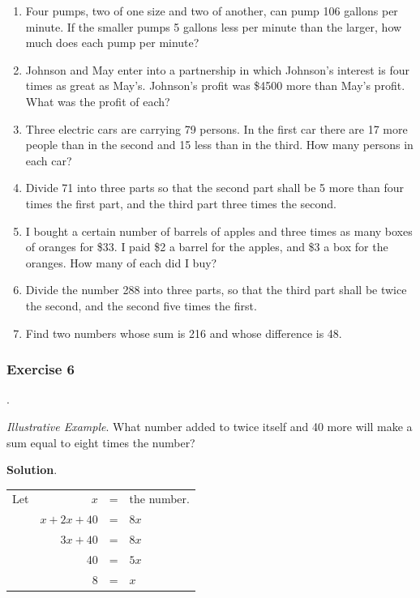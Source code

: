 \documentclass{book}
\begin{document}
\begin{enumerate}
\item Four pumps, two of one size and two of another, can pump 106
gallons per minute. If the smaller pumps 5 gallons less per minute
than the larger, how much does each pump per minute?

\item Johnson and May enter into a partnership in which Johnson's
interest is four times as great as May's. Johnson's profit was
\$4500 more than May's profit. What was the profit of each?

\item Three electric cars are carrying 79 persons. In the first
car there are 17 more people than in the second and 15 less than
in the third. How many persons in each car?

\item Divide 71 into three parts so that the second part shall be
5 more than four times the first part, and the third part three
times the second.

\item I bought a certain number of barrels of apples and three
times as many boxes of oranges for \$33. I paid \$2 a barrel for
the apples, and \$3 a box for the oranges. How many of each did I
buy?

\item Divide the number 288 into three parts, so that the third
part shall be twice the second, and the second five times the
first.

\item Find two numbers whose sum is 216 and whose difference is
48.
\end{enumerate}

\subsubsection*{Exercise 6}.

\textit{ Illustrative Example}. What number added to twice itself
and 40 more will make a sum equal to eight times the number?

\begin{center}
\textbf{ Solution}.
\end{center}

\begin{center}
\begin{tabular}{l r c l}
Let & $x$ &=& the number. \\
& $x + 2x + 40$ &=& $8x$\\
& $3x + 40$ &=& $8x$\\
& 40 &=& $5x$\\
& $8 $&=& $x$\\
\end{tabular}
\end{center}
\end{document}
